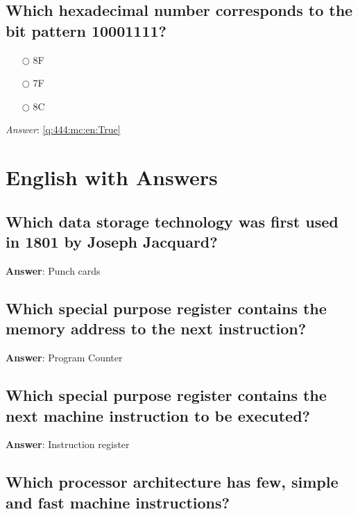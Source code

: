 \documentclass[a4paper,11pt,oneside]{book}
\begin{document}
\begin{sloppypar}
\section{Which hexadecimal number corresponds to the bit pattern 10001111?}

\label{q:444:mc:en:False}

\begin{itemize}
  \item[$\bigcirc$] 8F
  \item[$\bigcirc$] 7F
  \item[$\bigcirc$] 8C
\end{itemize}

\vspace{1cm}

\textit{Answer}: \autoref{q:444:mc:en:True}

\chapter{English with Answers}
\label{englishWithAnswers}

\section{Which data storage technology was first used in 1801 by Joseph Jacquard?}

\label{q:3:sa:en:True}

\textbf{Answer}: Punch cards



\section{Which special purpose register contains the memory address to the next instruction?}

\label{q:4:sa:en:True}

\textbf{Answer}: Program Counter



\section{Which special purpose register contains the next machine instruction to be executed?}

\label{q:5:sa:en:True}

\textbf{Answer}: Instruction register



\section{Which processor architecture has few, simple and fast machine instructions?}


\end{sloppypar}
\end{document}
